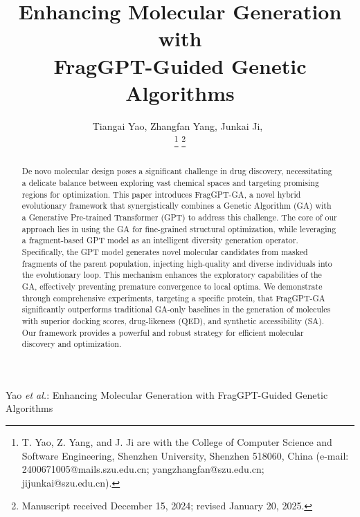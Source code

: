 \documentclass[lettersize,journal]{IEEEtran}
\begin{document}
\title{Enhancing Molecular Generation with\\FragGPT-Guided Genetic Algorithms}

\author{Tiangai Yao, Zhangfan Yang, Junkai Ji,~\\
\thanks{T. Yao, Z. Yang, and J. Ji are with the College of Computer Science and Software Engineering, Shenzhen University, Shenzhen 518060, China (e-mail: 2400671005@mails.szu.edu.cn; yangzhangfan@szu.edu.cn; jijunkai@szu.edu.cn).}%
\thanks{Manuscript received December 15, 2024; revised January 20, 2025.}}
%
{Yao \MakeLowercase{\textit{et al.}}: Enhancing Molecular Generation with FragGPT-Guided Genetic Algorithms}


\maketitle
\begin{abstract}
De novo molecular design poses a significant challenge in drug discovery, necessitating a delicate balance between exploring vast chemical spaces and targeting promising regions for optimization. This paper introduces FragGPT-GA, a novel hybrid evolutionary framework that synergistically combines a Genetic Algorithm (GA) with a Generative Pre-trained Transformer (GPT) to address this challenge. The core of our approach lies in using the GA for fine-grained structural optimization, while leveraging a fragment-based GPT model as an intelligent diversity generation operator. Specifically, the GPT model generates novel molecular candidates from masked fragments of the parent population, injecting high-quality and diverse individuals into the evolutionary loop. This mechanism enhances the exploratory capabilities of the GA, effectively preventing premature convergence to local optima. We demonstrate through comprehensive experiments, targeting a specific protein, that FragGPT-GA significantly outperforms traditional GA-only baselines in the generation of molecules with superior docking scores, drug-likeness (QED), and synthetic accessibility (SA). Our framework provides a powerful and robust strategy for efficient molecular discovery and optimization. 
\end{abstract}
\end{document}
